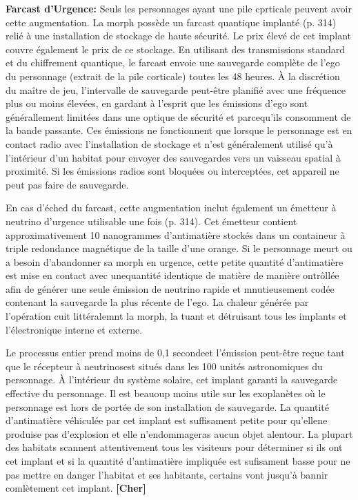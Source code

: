 {{\textbf{Farcast d'Urgence:} Seuls les personnages ayant une pile cprticale peuvent avoir cette augmentation. La morph possède un farcast quantique implanté (p. 314) relié à une installation de stockage de haute sécurité. Le prix élevé de cet  implant couvre également le prix de ce stockage. En utilisant des transmissions standard et du chiffrement quantique, le farcast envoie une sauvegarde complète de l'ego du personnage (extrait de la pile corticale) toutes les 48 heures. À la discrétion du maître de jeu, l'intervalle de sauvegarde peut-être planifié avec une fréquence plus ou moins élevées, en gardant à l'esprit que les émissions d'ego sont générallement limitées dans une optique de sécurité et parcequ'ils consomment de la bande passante. Ces émissions ne fonctionnent que lorsque le personnage est en contact radio avec l'installation de stockage et n'est généralement utilisé qu'à l'intérieur d'un habitat pour envoyer des sauvegardes vers un vaisseau spatial à proximité. Si les émissions radios sont bloquées ou interceptées, cet appareil ne peut pas faire de sauvegarde. 

En cas d'éched du farcast, cette augmentation inclut également un émetteur à neutrino d'urgence utilisable une fois (p. 314). Cet émetteur contient approximativement 10 nanogrammes d'antimatière stockés dans un containeur à triple redondance magnétique de la taille d'une orange. Si le personnage meurt ou a besoin d'abandonner sa morph en urgence, cette petite quantité d'antimatière est mise en contact avec unequantité identique de matière de manière ontrôllée afin de générer une seule émission de neutrino rapide et mnutieusement codée contenant la sauvegarde la plus récente de l'ego. La chaleur générée par l'opération cuit littéralemnt la morph, la tuant et détruisant tous les implants et l'électronique interne et externe. 

Le processus entier prend moins de 0,1 secondeet l'émission peut-être reçue tant que le récepteur à neutrinosest situés dans les 100 unités astronomiques du personnage. À l'intérieur du système solaire, cet implant garanti la sauvegarde effective du personnage. Il est beauoup moins utile sur les exoplanètes où le personnage est hors de portée de son installation de sauvegarde. La quantité d'antimatière véhiculée par cet implant est suffisament petite pour qu'ellene produise pas d'explosion et elle n'endommageras aucun objet alentour. La plupart des habitats scannent attentivement  tous les visiteurs pour déterminer si ils ont cet implant et si la quantité d'antimatière impliquée est sufisament basse pour ne pas mettre en danger l'habitat et ses habitants, certains vont jusqu'à bannir comlètement cet implant. \textbf{[Cher]} 

}}
